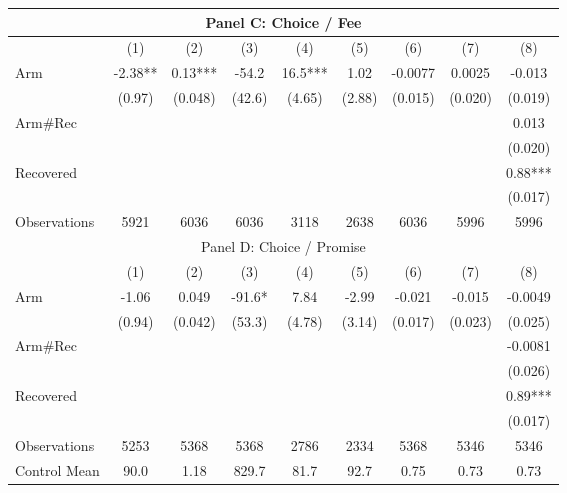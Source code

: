 \begin{tabular}{lcccccccc}
\multicolumn{9}{c}{Panel C: Choice / Fee} \\
\midrule
\midrule
      & (1)   & (2)   & (3)   & (4)   & (5)   & (6)   & (7)   & (8) \\
\midrule
\midrule
Arm   & -2.38** & 0.13*** & -54.2 & 16.5*** & 1.02  & -0.0077 & 0.0025 & -0.013 \\
      & (0.97) & (0.048) & (42.6) & (4.65) & (2.88) & (0.015) & (0.020) & (0.019) \\
Arm\#Rec &       &       &       &       &       &       &       & 0.013 \\
      &       &       &       &       &       &       &       & (0.020) \\
Recovered &       &       &       &       &       &       &       & 0.88*** \\
      &       &       &       &       &       &       &       & (0.017) \\
\midrule
Observations & 5921  & 6036  & 6036  & 3118  & 2638  & 6036  & 5996  & 5996 \\
\midrule
\multicolumn{9}{c}{Panel D: Choice / Promise} \\
\midrule
\midrule
      & (1)   & (2)   & (3)   & (4)   & (5)   & (6)   & (7)   & (8) \\
\midrule
\midrule
Arm   & -1.06 & 0.049 & -91.6* & 7.84  & -2.99 & -0.021 & -0.015 & -0.0049 \\
      & (0.94) & (0.042) & (53.3) & (4.78) & (3.14) & (0.017) & (0.023) & (0.025) \\
Arm\#Rec &       &       &       &       &       &       &       & -0.0081 \\
      &       &       &       &       &       &       &       & (0.026) \\
Recovered &       &       &       &       &       &       &       & 0.89*** \\
      &       &       &       &       &       &       &       & (0.017) \\
\midrule
Observations & 5253  & 5368  & 5368  & 2786  & 2334  & 5368  & 5346  & 5346 \\
\midrule
\midrule
Control Mean & 90.0  & 1.18  & 829.7 & 81.7  & 92.7  & 0.75  & 0.73  & 0.73 \\
\bottomrule
\bottomrule
\end{tabular}%
